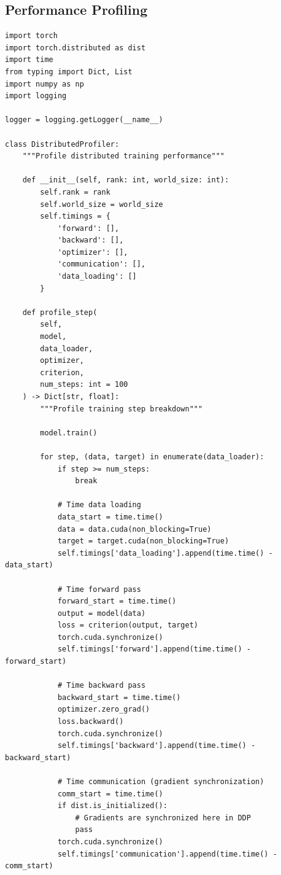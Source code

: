 \subsection{Performance Profiling}

\begin{lstlisting}[style=python, caption=Distributed Training Performance Profiler]
import torch
import torch.distributed as dist
import time
from typing import Dict, List
import numpy as np
import logging

logger = logging.getLogger(__name__)

class DistributedProfiler:
    """Profile distributed training performance"""

    def __init__(self, rank: int, world_size: int):
        self.rank = rank
        self.world_size = world_size
        self.timings = {
            'forward': [],
            'backward': [],
            'optimizer': [],
            'communication': [],
            'data_loading': []
        }

    def profile_step(
        self,
        model,
        data_loader,
        optimizer,
        criterion,
        num_steps: int = 100
    ) -> Dict[str, float]:
        """Profile training step breakdown"""

        model.train()

        for step, (data, target) in enumerate(data_loader):
            if step >= num_steps:
                break

            # Time data loading
            data_start = time.time()
            data = data.cuda(non_blocking=True)
            target = target.cuda(non_blocking=True)
            self.timings['data_loading'].append(time.time() - data_start)

            # Time forward pass
            forward_start = time.time()
            output = model(data)
            loss = criterion(output, target)
            torch.cuda.synchronize()
            self.timings['forward'].append(time.time() - forward_start)

            # Time backward pass
            backward_start = time.time()
            optimizer.zero_grad()
            loss.backward()
            torch.cuda.synchronize()
            self.timings['backward'].append(time.time() - backward_start)

            # Time communication (gradient synchronization)
            comm_start = time.time()
            if dist.is_initialized():
                # Gradients are synchronized here in DDP
                pass
            torch.cuda.synchronize()
            self.timings['communication'].append(time.time() - comm_start)


\end{lstlisting}
